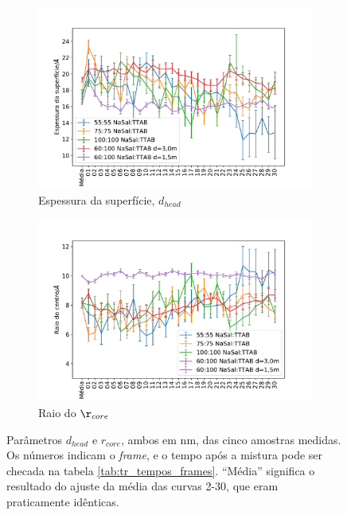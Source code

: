 	\begin{figure}
		\begin{subfigure}[t]{0.5\textwidth}
			\centering
			\includegraphics[width=\textwidth]{imagens/saxs/param_d_head}
			\caption{Espessura da superfície, \(d_{head}\)}
			\label{fig:param_dhead}
		\end{subfigure} %
		\begin{subfigure}[t]{0.5\textwidth}
			\centering
			\includegraphics[width=\textwidth]{imagens/saxs/param_rad_core}
			\caption{Raio do \(\r_{core}\)}
			\label{fig:param_radcore}
		\end{subfigure}
		\caption{Parâmetros \(d_{head}\) e \(r_{core}\), ambos em nm, das cinco amostras medidas. Os números indicam o \emph{frame}, e o tempo após a mistura pode ser checada na tabela \ref{tab:tr_tempos_frames}. ``Média'' significa o resultado do ajuste da média das curvas 2-30, que eram praticamente idênticas.}
		\label{fig:params_dhead_radcore}
	\end{figure}

